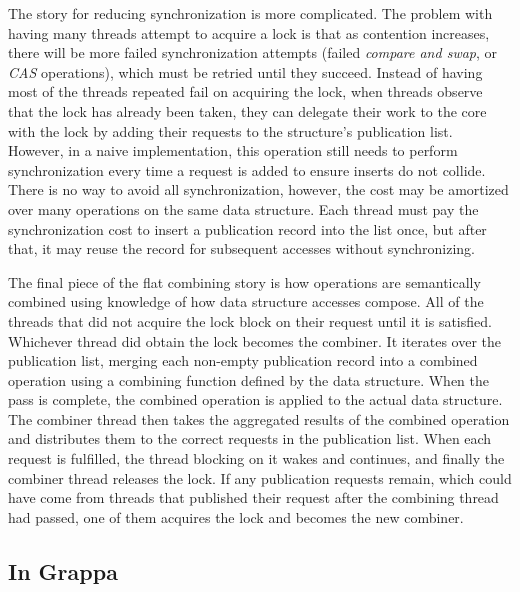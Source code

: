 The story for reducing synchronization is more complicated. The problem with having many threads attempt to acquire a lock is that as contention increases, there will be more failed synchronization attempts (failed \emph{compare and swap}, or \emph{CAS} operations), which must be retried until they succeed.
Instead of having most of the threads repeated fail on acquiring the lock, when threads observe that the lock has already been taken, they can delegate their work to the core with the lock by adding their requests to the structure's publication list. However, in a naive implementation, this operation still needs to perform synchronization every time a request is added to ensure inserts do not collide.
There is no way to avoid all synchronization, however, the cost may be amortized over many operations on the same data structure. Each thread must pay the synchronization cost to insert a publication record into the list once, but after that, it may reuse the record for subsequent accesses without synchronizing.

The final piece of the flat combining story is how operations are semantically combined using knowledge of how data structure accesses compose. All of the threads that did not acquire the lock block on their request until it is satisfied. Whichever thread did obtain the lock becomes the combiner. It iterates over the publication list, merging each non-empty publication record into a combined operation using a combining function defined by the data structure. When the pass is complete, the combined operation is applied to the actual data structure. The combiner thread then takes the aggregated results of the combined operation and distributes them to the correct requests in the publication list. When each request is fulfilled, the thread blocking on it wakes and continues, and finally the combiner thread releases the lock. If any publication requests remain, which could have come from threads that published their request after the combining thread had passed, one of them acquires the lock and becomes the new combiner.


\subsection{In Grappa}

